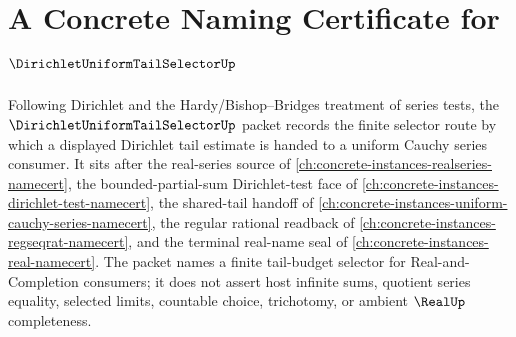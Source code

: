\chapter{A Concrete Naming Certificate for $\DirichletUniformTailSelectorUp$}
\label{ch:concrete-instances-dirichlet-uniform-tail-selector-namecert}

Following Dirichlet and the Hardy/Bishop--Bridges treatment of series tests, the $\DirichletUniformTailSelectorUp$ packet records the finite selector route by which a displayed Dirichlet tail estimate is handed to a uniform Cauchy series consumer. It sits after the real-series source of \autoref{ch:concrete-instances-realseries-namecert}, the bounded-partial-sum Dirichlet-test face of \autoref{ch:concrete-instances-dirichlet-test-namecert}, the shared-tail handoff of \autoref{ch:concrete-instances-uniform-cauchy-series-namecert}, the regular rational readback of \autoref{ch:concrete-instances-regseqrat-namecert}, and the terminal real-name seal of \autoref{ch:concrete-instances-real-namecert}. The packet names a finite tail-budget selector for Real-and-Completion consumers; it does not assert host infinite sums, quotient series equality, selected limits, countable choice, trichotomy, or ambient $\RealUp$ completeness.

